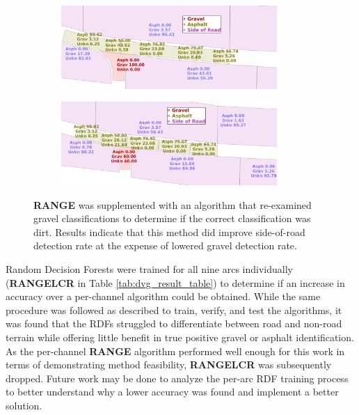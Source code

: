 \documentclass[numbered,pdftex]{ohio-etd}
\begin{document}
{{%
		\begin{figure}[H]
			\centering
			\begin{subfigure}[b]{\textwidth}
				\centering
				\includegraphics[width=0.9\textwidth]{Defense_Images/range_actual_rm_db_4_area_score}
				\caption{}
				\label{fig:db_4_raw_range_2}
			\end{subfigure}
			\vspace{1cm} %
			\begin{subfigure}[b]{\textwidth}
				\centering
				\includegraphics[width=0.9\textwidth]{Defense_Images/dvg_example}
				\caption{}
				\label{fig:dvg_example}
			\end{subfigure}
			\caption[Complementary RDF Area Scores]{\textbf{RANGE} was supplemented with an algorithm that re-examined gravel classifications to determine if the correct classification was dirt. Results indicate that this method did improve side-of-road detection rate at the expense of lowered gravel detection rate. }
			\label{fig:area_score_comp}
		\end{figure}
	
		{Random Decision Forests were trained for all nine arcs individually (\textbf{RANGELCR} in Table \ref{tab:dvg_result_table}) to determine if an increase in accuracy over a per-channel algorithm could be obtained. While the same procedure was followed as described to train, verify, and test the algorithms, it was found that the RDFs struggled to differentiate between road and non-road terrain while offering little benefit in true positive gravel or asphalt identification. As the per-channel \textbf{RANGE} algorithm performed well enough for this work in terms of demonstrating method feasibility, \textbf{RANGELCR} was subsequently dropped. Future work may be done to analyze the per-arc RDF training process to better understand why a lower accuracy was found and implement a better solution.}
		
}}
\end{document}
